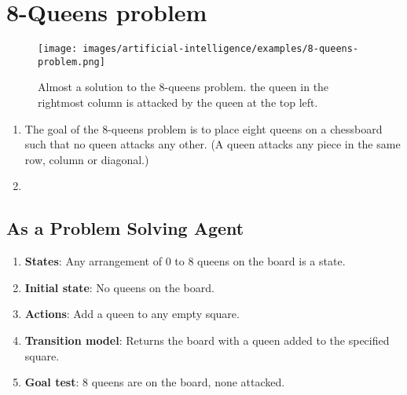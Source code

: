 \section{8-Queens problem}

\begin{figure}[H]
    \centering
    \texttt{[image: images/artificial-intelligence/examples/8-queens-problem.png]}
    \caption{Almost a solution to the 8-queens problem. the queen in the rightmost column is attacked by the queen at the top left.}
\end{figure}


\begin{enumerate}
    \item The goal of the 8-queens problem is to place eight queens on a chessboard such that no queen attacks any other.
    (A queen attacks any piece in the same row, column or diagonal.)
    \hfill \cite{ai/book/Artificial-Intelligence-A-Modern-Approach/Russell-Norvig}

    \item
    \hfill \cite{ai/book/Artificial-Intelligence-A-Modern-Approach/Russell-Norvig}
\end{enumerate}


\subsection{As a Problem Solving Agent}

\begin{enumerate}
    \item \textbf{States}: Any arrangement of 0 to 8 queens on the board is a state.
    \hfill \cite{ai/book/Artificial-Intelligence-A-Modern-Approach/Russell-Norvig}

    \item \textbf{Initial state}: No queens on the board.
    \hfill \cite{ai/book/Artificial-Intelligence-A-Modern-Approach/Russell-Norvig}

    \item \textbf{Actions}: Add a queen to any empty square.
    \hfill \cite{ai/book/Artificial-Intelligence-A-Modern-Approach/Russell-Norvig}

    \item \textbf{Transition model}: Returns the board with a queen added to the specified square.
    \hfill \cite{ai/book/Artificial-Intelligence-A-Modern-Approach/Russell-Norvig}

    \item \textbf{Goal test}: 8 queens are on the board, none attacked.
    \hfill \cite{ai/book/Artificial-Intelligence-A-Modern-Approach/Russell-Norvig}
\end{enumerate}



